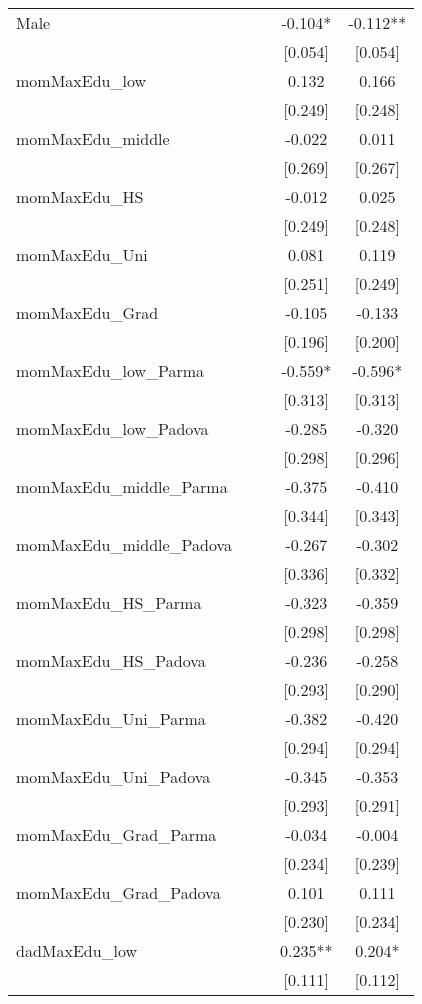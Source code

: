 \documentclass[]{article}
\begin{document}
\begin{tabular}{lcccc}
Male &  &  & -0.104* & -0.112** \\
 &  &  & [0.054] & [0.054] \\
momMaxEdu\_low &  &  & 0.132 & 0.166 \\
 &  &  & [0.249] & [0.248] \\
momMaxEdu\_middle &  &  & -0.022 & 0.011 \\
 &  &  & [0.269] & [0.267] \\
momMaxEdu\_HS &  &  & -0.012 & 0.025 \\
 &  &  & [0.249] & [0.248] \\
momMaxEdu\_Uni &  &  & 0.081 & 0.119 \\
 &  &  & [0.251] & [0.249] \\
momMaxEdu\_Grad &  &  & -0.105 & -0.133 \\
 &  &  & [0.196] & [0.200] \\
momMaxEdu\_low\_Parma &  &  & -0.559* & -0.596* \\
 &  &  & [0.313] & [0.313] \\
momMaxEdu\_low\_Padova &  &  & -0.285 & -0.320 \\
 &  &  & [0.298] & [0.296] \\
momMaxEdu\_middle\_Parma &  &  & -0.375 & -0.410 \\
 &  &  & [0.344] & [0.343] \\
momMaxEdu\_middle\_Padova &  &  & -0.267 & -0.302 \\
 &  &  & [0.336] & [0.332] \\
momMaxEdu\_HS\_Parma &  &  & -0.323 & -0.359 \\
 &  &  & [0.298] & [0.298] \\
momMaxEdu\_HS\_Padova &  &  & -0.236 & -0.258 \\
 &  &  & [0.293] & [0.290] \\
momMaxEdu\_Uni\_Parma &  &  & -0.382 & -0.420 \\
 &  &  & [0.294] & [0.294] \\
momMaxEdu\_Uni\_Padova &  &  & -0.345 & -0.353 \\
 &  &  & [0.293] & [0.291] \\
momMaxEdu\_Grad\_Parma &  &  & -0.034 & -0.004 \\
 &  &  & [0.234] & [0.239] \\
momMaxEdu\_Grad\_Padova &  &  & 0.101 & 0.111 \\
 &  &  & [0.230] & [0.234] \\
dadMaxEdu\_low &  &  & 0.235** & 0.204* \\
 &  &  & [0.111] & [0.112] \\

\end{tabular}
\end{document}
